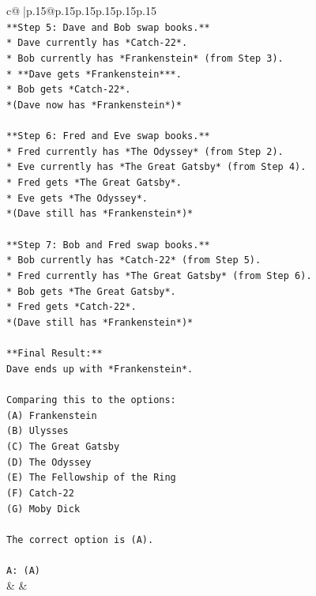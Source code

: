 \documentclass{article}
\begin{document}
{\begin{supertabular}{c@{$\;$}|p{.15\linewidth}@{}p{.15\linewidth}p{.15\linewidth}p{.15\linewidth}p{.15\linewidth}p{.15\linewidth}}
{{{\\ 
\texttt{**Step 5: Dave and Bob swap books.**} \\
\texttt{*   Dave currently has *Catch{-}22*.} \\
\texttt{*   Bob currently has *Frankenstein* (from Step 3).} \\
\texttt{*   **Dave gets *Frankenstein***.} \\
\texttt{*   Bob gets *Catch{-}22*.} \\
\texttt{*(Dave now has *Frankenstein*)*} \\
\\ 
\texttt{**Step 6: Fred and Eve swap books.**} \\
\texttt{*   Fred currently has *The Odyssey* (from Step 2).} \\
\texttt{*   Eve currently has *The Great Gatsby* (from Step 4).} \\
\texttt{*   Fred gets *The Great Gatsby*.} \\
\texttt{*   Eve gets *The Odyssey*.} \\
\texttt{*(Dave still has *Frankenstein*)*} \\
\\ 
\texttt{**Step 7: Bob and Fred swap books.**} \\
\texttt{*   Bob currently has *Catch{-}22* (from Step 5).} \\
\texttt{*   Fred currently has *The Great Gatsby* (from Step 6).} \\
\texttt{*   Bob gets *The Great Gatsby*.} \\
\texttt{*   Fred gets *Catch{-}22*.} \\
\texttt{*(Dave still has *Frankenstein*)*} \\
\\ 
\texttt{**Final Result:**} \\
\texttt{Dave ends up with *Frankenstein*.} \\
\\ 
\texttt{Comparing this to the options:} \\
\texttt{(A) Frankenstein} \\
\texttt{(B) Ulysses} \\
\texttt{(C) The Great Gatsby} \\
\texttt{(D) The Odyssey} \\
\texttt{(E) The Fellowship of the Ring} \\
\texttt{(F) Catch{-}22} \\
\texttt{(G) Moby Dick} \\
\\ 
\texttt{The correct option is (A).} \\
\\ 
\texttt{A: (A)} \\
            }
        }
    }
    & & \\ \\


\end{supertabular}}
\end{document}
